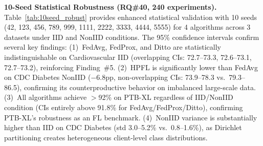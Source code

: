 \documentclass[conference]{IEEEtran}
\begin{document}
\smallskip\noindent\textbf{10-Seed Statistical Robustness (RQ\#40, 240 experiments).}
Table~\ref{tab:10seed_robust} provides enhanced statistical validation with 10 seeds (42, 123, 456, 789, 999, 1111, 2222, 3333, 4444, 5555) for 4 algorithms across 3 datasets under IID and NonIID conditions. The 95\% confidence intervals confirm several key findings: (1)~FedAvg, FedProx, and Ditto are statistically indistinguishable on Cardiovascular IID (overlapping CIs: 72.7--73.3, 72.6--73.1, 72.7--73.2), reinforcing Finding~\#5. (2)~HPFL is significantly lower than FedAvg on CDC Diabetes NonIID ($-$6.8pp, non-overlapping CIs: 73.9--78.3 vs.\ 79.3--86.5), confirming its counterproductive behavior on imbalanced large-scale data. (3)~All algorithms achieve $>$92\% on PTB-XL regardless of IID/NonIID condition (CIs entirely above 91.8\% for FedAvg/FedProx/Ditto), confirming PTB-XL's robustness as an FL benchmark. (4)~NonIID variance is substantially higher than IID on CDC Diabetes (std 3.0--5.2\% vs.\ 0.8--1.6\%), as Dirichlet partitioning creates heterogeneous client-level class distributions.
\end{document}
